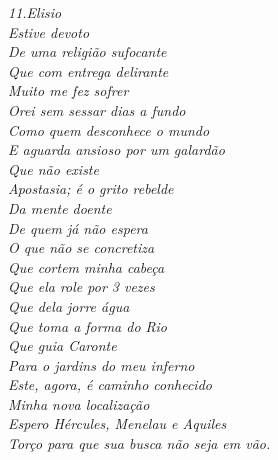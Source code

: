 \clearpage
\thispagestyle{empty}

\vspace*{\fill}

\begin{flushright}
    \itshape
    11.Elisio \\[0.5cm]

    Estive devoto \\
    De uma religião sufocante \\
    Que com entrega delirante \\
    Muito me fez sofrer \\
    [\baselineskip]
    Orei sem sessar dias a fundo \\
    Como quem desconhece o mundo \\
    E aguarda ansioso por um galardão \\
    Que não existe \\
    [\baselineskip]
    Apostasia; é o grito rebelde \\
    Da mente doente \\
    De quem já não espera \\
    O que não se concretiza \\
    [\baselineskip]
    Que cortem minha cabeça \\
    Que ela role por 3 vezes \\
    Que dela jorre água \\
    Que toma a forma do Rio \\
    Que guia Caronte \\
    Para o jardins do meu inferno \\
    [\baselineskip]
    Este, agora, é caminho conhecido \\
    Minha nova localização \\
    Espero Hércules, Menelau e Aquiles \\
    Torço para que sua busca não seja em vão.
\end{flushright}

\clearpage
